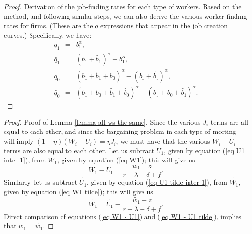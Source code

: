 \documentclass[12pt]{article} %
\theoremstyle{definition}
\begin{document}
\begin{appendix}
\begin{proof}{Derivation of the job-finding rates for each type of workers.}
Based on the \cite{petrongolo2001looking} method, and following similar steps, we can also derive the various worker-finding rates for firms. (These are the $q$ expressions that appear in the job creation curves.) Specifically, we have:  
\begin{eqnarray*}
q_1 &=& b_1^\alpha, \\
\tilde{q_1} &=&  (b_1+\tilde{b_1})^\alpha - b_1^\alpha, \\
q_0 &=& (b_1+\tilde{b_1}+b_0)^\alpha - (b_1+\tilde{b_1})^\alpha, \\
\tilde{q_0} &=&  (b_1+b_0+\tilde{b_1}+\tilde{b_0})^\alpha - (b_1+b_0+\tilde{b_1})^\alpha.
\end{eqnarray*}
\end{proof}

\begin{proof}{Proof of Lemma \ref{lemma all ws the same}.}
Since the various $J_i$ terms are all equal to each other, and since the bargaining problem in each type of meeting will imply $(1-\eta)(W_i-U_i)=\eta J_i$, we must have that the various $W_i-U_i$ terms are also equal to each other. Let us subtract $U_1$, given by equation (\ref{eq U1 inter 1}), from $W_1$, given by equation (\ref{eq W1}); this will give us 
\begin{equation}
W_1-U_1=\frac{w_1-z}{r+\lambda+\delta+f}. \label{eq W1 - U1}
\end{equation}Similarly, let us subtract $\tilde{U_1}$, given by equation (\ref{eq U1 tilde inter 1}), from $\tilde{W_1}$, given by equation (\ref{eq W1 tilde}); this will give us 
\begin{equation}
\tilde{W_1}-\tilde{U_1}=\frac{\tilde{w_1}-z}{r+\lambda+\delta+f}. \label{eq W1 - U1 tilde} 
\end{equation}Direct comparison of equations (\ref{eq W1 - U1}) and (\ref{eq W1 - U1 tilde}), implies that $w_1=\tilde{w_1}$. 


\end{proof}
\end{appendix}
\end{document}
